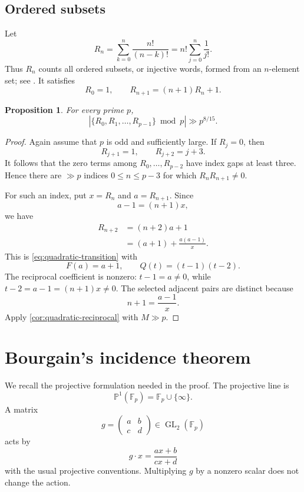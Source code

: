 \documentclass[11pt,reqno]{amsart}
\numberwithin{equation}{section}
\newtheorem{proposition}[proposition]{Proposition}
\theoremstyle{definition}
\theoremstyle{remark}
\newcommand{\F}{\mathbb F}
\newcommand{\Pone}{\mathbb P^1}
\newcommand{\GL}{\operatorname{GL}}
\begin{document}
\subsection{Ordered subsets}

Let
\begin{equation}\label{eq:arrangement-def}
  R_n=\sum_{k=0}^n\frac{n!}{(n-k)!}
  =n!\sum_{j=0}^n\frac1{j!}.
\end{equation}
Thus $R_n$ counts all ordered subsets, or injective words, formed from an $n$-element set; see \cite{Stanley2012}.  It satisfies
\begin{equation}\label{eq:arrangement-recurrence}
  R_0=1,
  \qquad
  R_{n+1}=(n+1)R_n+1.
\end{equation}

\begin{proposition}\label{prop:arrangements}
For every prime $p$,
\begin{equation}\label{eq:arrangement-bound}
  \left|\{R_0,R_1,\ldots,R_{p-1}\}\bmod p\right|
  \gg p^{8/15}.
\end{equation}
\end{proposition}

\begin{proof}
Again assume that $p$ is odd and sufficiently large.  If $R_j=0$, then
\[
  R_{j+1}=1,
  \qquad
  R_{j+2}=j+3.
\]
It follows that the zero terms among $R_0,\ldots,R_{p-2}$ have index gaps at least three.  Hence there are $\gg p$ indices $0\le n\le p-3$ for which $R_nR_{n+1}\ne0$.

For such an index, put $x=R_n$ and $a=R_{n+1}$.  Since
\[
  a-1=(n+1)x,
\]
we have
\begin{align*}
  R_{n+2}
  &=(n+2)a+1\\
  &=(a+1)+\frac{a(a-1)}{x}.
\end{align*}
This is \eqref{eq:quadratic-transition} with
\[
  F(a)=a+1,
  \qquad
  Q(t)=(t-1)(t-2).
\]
The reciprocal coefficient is nonzero: $t-1=a\ne0$, while $t-2=a-1=(n+1)x\ne0$.  The selected adjacent pairs are distinct because
\[
  n+1=\frac{a-1}{x}.
\]
Apply \cref{cor:quadratic-reciprocal} with $M\gg p$.
\end{proof}

\section{Bourgain's incidence theorem}\label{sec:bourgain}

We recall the projective formulation needed in the proof.  The projective line is
\[
  \Pone(\F_p)=\F_p\cup\{\infty\}.
\]
A matrix
\[
  g=\begin{pmatrix}a&b\\c&d\end{pmatrix}\in\GL_2(\F_p)
\]
acts by
\[
  g\cdot x=\frac{ax+b}{cx+d}
\]
with the usual projective conventions.  Multiplying $g$ by a nonzero scalar does not change the action.
\end{document}
